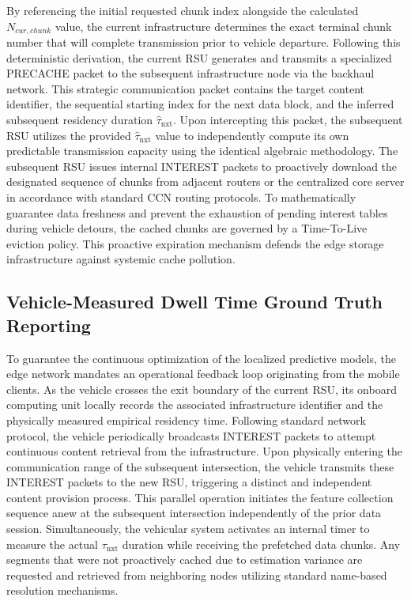 \documentclass[journal]{IEEEtran}
\begin{document}
By referencing the initial requested chunk index alongside the calculated $N_{cur, chunk}$ value, the current infrastructure determines the exact terminal chunk number that will complete transmission prior to vehicle departure.
Following this deterministic derivation, the current RSU generates and transmits a specialized PRECACHE packet to the subsequent infrastructure node via the backhaul network.
This strategic communication packet contains the target content identifier, the sequential starting index for the next data block, and the inferred subsequent residency duration $\hat{\tau}_{\text{nxt}}$.
Upon intercepting this packet, the subsequent RSU utilizes the provided $\hat{\tau}_{\text{nxt}}$ value to independently compute its own predictable transmission capacity using the identical algebraic methodology.
The subsequent RSU issues internal INTEREST packets to proactively download the designated sequence of chunks from adjacent routers or the centralized core server in accordance with standard CCN routing protocols.
To mathematically guarantee data freshness and prevent the exhaustion of pending interest tables during vehicle detours, the cached chunks are governed by a Time-To-Live eviction policy.
This proactive expiration mechanism defends the edge storage infrastructure against systemic cache pollution.

\subsection{Vehicle-Measured Dwell Time Ground Truth Reporting} \label{sec.prop.D}
To guarantee the continuous optimization of the localized predictive models, the edge network mandates an operational feedback loop originating from the mobile clients.
As the vehicle crosses the exit boundary of the current RSU, its onboard computing unit locally records the associated infrastructure identifier and the physically measured empirical residency time.
Following standard network protocol, the vehicle periodically broadcasts INTEREST packets to attempt continuous content retrieval from the infrastructure.
Upon physically entering the communication range of the subsequent intersection, the vehicle transmits these INTEREST packets to the new RSU, triggering a distinct and independent content provision process.
This parallel operation initiates the feature collection sequence anew at the subsequent intersection independently of the prior data session.
Simultaneously, the vehicular system activates an internal timer to measure the actual $\tau_{\text{nxt}}$ duration while receiving the prefetched data chunks.
Any segments that were not proactively cached due to estimation variance are requested and retrieved from neighboring nodes utilizing standard name-based resolution mechanisms.
\end{document}

